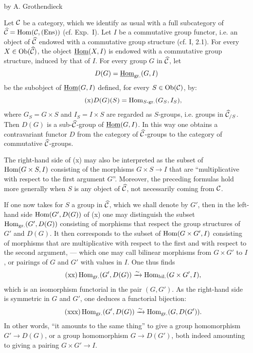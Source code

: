 \label{VIII}
\begin{center}by A. Grothendieck\end{center}

Let $\cal C$ be a category, which we identify as usual with a full subcategory of $\widehat{\cal C}=\Hom(\cal C,\Ens)$ (cf. Exp.~I). Let $I$ be a commutative group functor, i.e. an object of $\widehat{\cal C}$ endowed with a commutative group structure (cf. I, 2.1). For every $X\in\Ob(\widehat{\cal C})$, the object $\uHom(X,I)$ is endowed with a commutative group structure, induced by that of $I$. For every group $G$ in $\widehat{\cal C}$, let
\[
D(G)=\uHom_{\mathrm{gr.}}(G,I)
\]
be the subobject of $\uHom(G,I)$ defined, for every $S\in\Ob(\cal C)$, by:
\begin{equation}\tag{x}
D(G)(S)=\Hom_{S\text{-}\mathrm{gr.}}(G_S,I_S),
\end{equation}
where $G_S=G\times S$ and $I_S=I\times S$ are regarded as $S$-groups, i.e. groups in $\widehat{\cal C}_{/S}$. Then $D(G)$ is a sub-$\widehat{\cal C}$-group of $\uHom(G,I)$. In this way one obtains a contravariant functor $D$ from the category of $\widehat{\cal C}$-groups to the category of commutative $\widehat{\cal C}$-groups.

The right-hand side of (x) may also be interpreted as the subset of $\Hom(G\times S,I)$ consisting of the morphisms $G\times S\to I$ that are ``multiplicative with respect to the first argument $G$''. Moreover, the preceding formulas hold more generally when $S$ is any object of $\widehat{\cal C}$, not necessarily coming from $\cal C$.

If one now takes for $S$ a group in $\widehat{\cal C}$, which we shall denote by $G'$, then in the left-hand side $\Hom(G',D(G))$ of (x) one may distinguish the subset $\Hom_{\mathrm{gr.}}(G',D(G))$ consisting of morphisms that respect the group structures of $G'$ and $D(G)$. It then corresponds to the subset of $\Hom(G\times G',I)$ consisting of morphisms that are multiplicative with respect to the first and with respect to the second argument, --- which one may call bilinear morphisms from $G\times G'$ to $I$, or pairings of $G$ and $G'$ with values in $I$. One thus finds
\begin{equation}\tag{xx}
\Hom_{\mathrm{gr.}}(G',D(G))\isomto\Hom_{\mathrm{bil.}}(G\times G',I),
\end{equation}
which is an isomorphism functorial in the pair $(G,G')$. As the right-hand side is symmetric in $G$ and $G'$, one deduces a functorial bijection:
\begin{equation}\tag{xxx}
\Hom_{\mathrm{gr.}}(G',D(G))\isomto\Hom_{\mathrm{gr.}}(G,D(G')).
\end{equation}
In other words, ``it amounts to the same thing'' to give a group homomorphism $G'\to D(G)$, or a group homomorphism $G\to D(G')$, both indeed amounting to giving a pairing $G\times G'\to I$.

